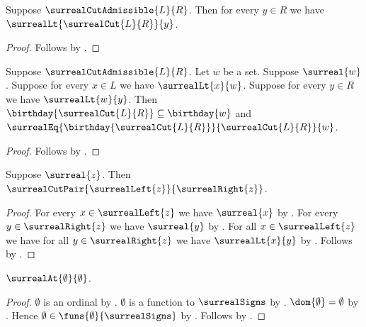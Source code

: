 \begin{corollary}\label{surreal_cut_right}
    Suppose $\surrealCutAdmissible{L}{R}$.
    Then for every $y\in R$ we have
        $\surrealLt{\surrealCut{L}{R}}{y}$.
\end{corollary}
\begin{proof}
    Follows by
        .
\end{proof}

\begin{corollary}\label{surreal_cut_simplest}
    Suppose $\surrealCutAdmissible{L}{R}$.
    Let $w$ be a set.
    Suppose $\surreal{w}$.
    Suppose for every $x\in L$ we have $\surrealLt{x}{w}$.
    Suppose for every $y\in R$ we have $\surrealLt{w}{y}$.
    Then $\birthday{\surrealCut{L}{R}}\subseteq\birthday{w}$ and
        $\surrealEq{\birthday{\surrealCut{L}{R}}}
            {\surrealCut{L}{R}}{w}$.
\end{corollary}
\begin{proof}
    Follows by
        .
\end{proof}

\begin{proposition}\label{surreal_options_form_cut_pair}
    Suppose $\surreal{z}$.
    Then $\surrealCutPair{\surrealLeft{z}}{\surrealRight{z}}$.
\end{proposition}
\begin{proof}
    For every $x\in\surrealLeft{z}$ we have $\surreal{x}$
        by .
    For every $y\in\surrealRight{z}$ we have $\surreal{y}$
        by .
    For all $x\in\surrealLeft{z}$ we have for all
        $y\in\surrealRight{z}$ we have $\surrealLt{x}{y}$
        by .
    Follows by .
\end{proof}

\begin{proposition}\label{empty_surreal_at}
    $\surrealAt{\emptyset}{\emptyset}$.
\end{proposition}
\begin{proof}
    $\emptyset$ is an ordinal by .
    $\emptyset$ is a function to $\surrealSigns$
        by .
    $\dom{\emptyset}=\emptyset$ by .
    Hence $\emptyset\in\funs{\emptyset}{\surrealSigns}$
        by .
    Follows by .
\end{proof}

